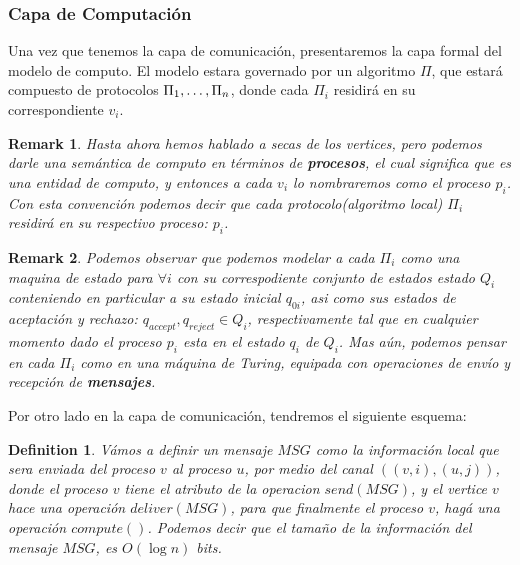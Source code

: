 \documentclass[10pt]{report}
\newtheorem*{remark}{Remark}
\newtheorem{definition}{Definition}
\begin{document}
    \subsubsection{Capa de Computación}
    Una vez que tenemos la capa de comunicación, presentaremos la capa formal del modelo de
    computo.\newline
    El modelo estara governado por un algoritmo $\Pi$, que estará compuesto de protocolos
    $\Pi_{1},\mathellipsis,\Pi_{n}$, donde cada $\Pi_{i}$ residirá en su correspondiente $v_{i}$.
    \newline
    \begin{remark}
        Hasta ahora hemos hablado a secas de los vertices, pero podemos darle una semántica
        de computo en términos de \textbf{procesos}, el cual significa que es una entidad de computo, y entonces a cada $v_{i}$
        lo nombraremos como el proceso $p_{i}$.\newline
        Con esta convención podemos decir que cada protocolo(algoritmo local) $\Pi_{i}$ residirá en su respectivo proceso:
        $p_{i}$.

    \end{remark}
    \begin{remark}
        Podemos observar que podemos modelar a cada $\Pi_{i}$ como una maquina de estado para $\forall i$ con su
        correspodiente conjunto de estados estado $Q_{i}$ conteniendo en particular a su estado inicial  $q_{0i}$, asi como sus estados de
        aceptación y rechazo: $q_{accept},q_{reject}\in Q_{i}$, respectivamente tal que en cualquier
        momento dado el proceso $p_{i}$ esta en el estado $q_{i}$ de $Q_{i}$.
        \space
        Mas aún, podemos pensar en cada $\Pi_{i}$ como en una máquina de Turing, equipada con operaciones de envío y
        recepción de \textbf{mensajes}.
    \end{remark}
    \newline
    Por otro lado en la capa de comunicación, tendremos el siguiente esquema:
    \newline
    \begin{definition}
        Vámos a definir un mensaje $MSG$ como la información local que sera enviada del proceso $v$ al proceso $u$,
        por medio del canal $((v,i),(u,j))$, donde el proceso $v$ tiene el atributo de la operacion $send(MSG)$, y el vertice
        $v$ hace una operación $deliver(MSG)$, para que finalmente el proceso $v$, hagá una operación $compute()$.
        \newline
        Podemos decir que el tamaño de la información del mensaje $MSG$, es $O(\log n)$ bits.
    \end{definition}
\end{document}

